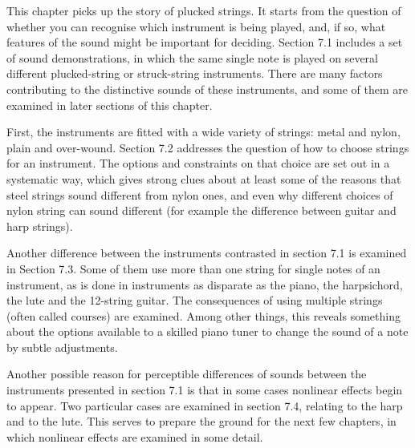   This chapter picks up the story of plucked strings. It starts from the 
  question of whether you can recognise which instrument is being played, and, 
  if so, what features of the sound might be important for deciding. Section 
  7.1 includes a set of sound demonstrations, in which the same single note is 
  played on several different plucked-string or struck-string instruments. 
  There are many factors contributing to the distinctive sounds of these 
  instruments, and some of them are examined in later sections of this chapter. 

  First, the instruments are fitted with a wide variety of strings: metal and 
  nylon, plain and over-wound. Section 7.2 addresses the question of how to 
  choose strings for an instrument. The options and constraints on that choice 
  are set out in a systematic way, which gives strong clues about at least some 
  of the reasons that steel strings sound different from nylon ones, and even 
  why different choices of nylon string can sound different (for example the 
  difference between guitar and harp strings). 

  Another difference between the instruments contrasted in section 7.1 is 
  examined in Section 7.3. Some of them use more than one string for single 
  notes of an instrument, as is done in instruments as disparate as the piano, 
  the harpsichord, the lute and the 12-string guitar. The consequences of using 
  multiple strings (often called courses) are examined. Among other things, 
  this reveals something about the options available to a skilled piano tuner 
  to change the sound of a note by subtle adjustments. 

  Another possible reason for perceptible differences of sounds between the 
  instruments presented in section 7.1 is that in some cases nonlinear effects 
  begin to appear. Two particular cases are examined in section 7.4, relating 
  to the harp and to the lute. This serves to prepare the ground for the next 
  few chapters, in which nonlinear effects are examined in some detail. 

